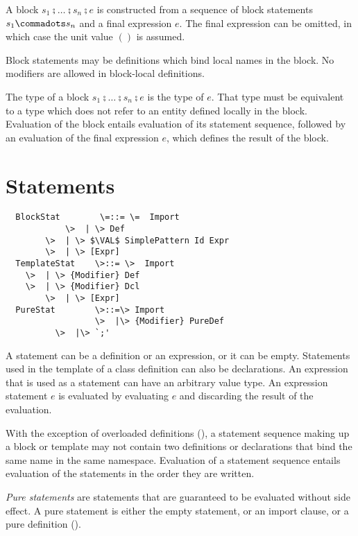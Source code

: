 \documentclass[11pt]{report}
\begin{document}
A block $s_1 \semi\ldots\semi s_n \semi e$
is constructed from a sequence of block statements $s_1 \commadots s_n$
and a final expression $e$. The final expression can be omitted, in
which case the unit value $()$ is assumed.

Block statements may be definitions which bind local names in the
block. No modifiers are allowed in block-local definitions.


The type of a block $s_1 \semi\ldots\semi s_n \semi e$ is the type of $e$.  That
type must be equivalent to a type which does not refer to an entity
defined locally in the block.
Evaluation of the block entails
evaluation of its statement sequence, followed by an evaluation of the final expression
$e$, which defines the result of the block.

\section{Statements}
\label{sec:statements}

\syntax\begin{verbatim}
  BlockStat        \=::= \=  Import
            \>  | \> Def
	    \>  | \> $\VAL$ SimplePattern Id Expr
	    \>  | \> [Expr]
  TemplateStat    \>::= \>  Import
	\>  | \> {Modifier} Def
	\>  | \> {Modifier} Dcl
        \>  | \> [Expr]
  PureStat        \>::=\> Import
                  \>  |\> {Modifier} PureDef
		  \>  |\> `;'
\end{verbatim}

A statement can be a definition or an expression, or it can be empty.
Statements used in the template of a class definition can also be
declarations.  An expression that is used as a statement can have an
arbitrary value type. An expression statement $e$ is evaluated by
evaluating $e$ and discarding the result of the evaluation.

With the exception of overloaded definitions
(), a statement sequence making up a block
or template may not contain two definitions or declarations that bind
the same name in the same namespace.  Evaluation of a statement
sequence entails evaluation of the statements in the order they are
written.

{\em Pure statements} are statements that are guaranteed to be
evaluated without side effect. A pure statement is either the empty
statement, or an import clause, or a pure definition ().
\end{document}

